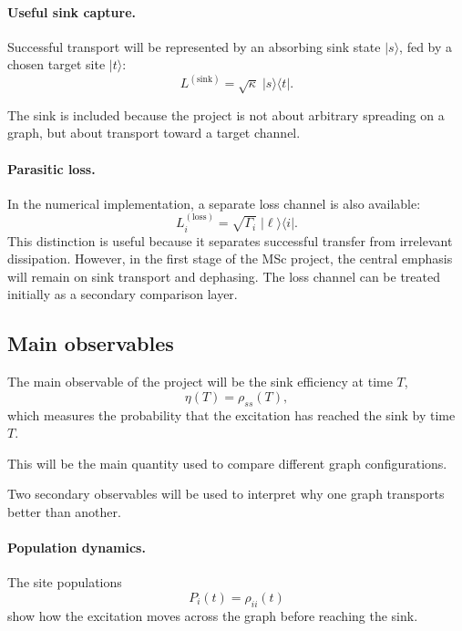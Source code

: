 \documentclass[11pt,a4paper]{article}
\begin{document}
\paragraph{Useful sink capture.}
Successful transport will be represented by an absorbing sink state
$|s\rangle$, fed by a chosen target site $|t\rangle$:
\begin{equation}
L^{(\mathrm{sink})} = \sqrt{\kappa}\; |s\rangle\langle t|.
\label{eq:sink}
\end{equation}

The sink is included because the project is not about arbitrary spreading on a
graph, but about transport toward a target channel.

\paragraph{Parasitic loss.}
In the numerical implementation, a separate loss channel is also available:
\begin{equation}
L_i^{(\mathrm{loss})} = \sqrt{\Gamma_i}\; |\ell\rangle\langle i|.
\label{eq:loss}
\end{equation}
This distinction is useful because it separates successful transfer from
irrelevant dissipation. However, in the first stage of the MSc project, the
central emphasis will remain on sink transport and dephasing. The loss channel
can be treated initially as a secondary comparison layer.

\subsection{Main observables}

The main observable of the project will be the sink efficiency at time $T$,
\begin{equation}
\eta(T)=\rho_{ss}(T),
\label{eq:efficiency}
\end{equation}
which measures the probability that the excitation has reached the sink by time
$T$.

This will be the main quantity used to compare different graph configurations.

Two secondary observables will be used to interpret why one graph transports
better than another.

\paragraph{Population dynamics.}
The site populations
\begin{equation}
P_i(t)=\rho_{ii}(t)
\label{eq:population}
\end{equation}
show how the excitation moves across the graph before reaching the sink.
\end{document}
